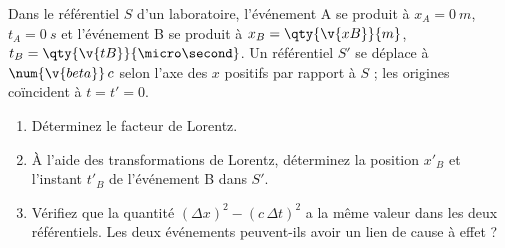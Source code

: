 Dans le référentiel $S$ d'un laboratoire, l'événement A se produit à $x_A = \qty{0}{m}$, $t_A = \qty{0}{s}$ et l'événement B se produit à $x_B = \qty{\v{xB}}{m}$, $t_B = \qty{\v{tB}}{\micro\second}$. Un référentiel $S'$ se déplace à $\num{\v{beta}}\,c$ selon l'axe des $x$ positifs par rapport à $S$ ; les origines coïncident à $t = t' = 0$.

\begin{enumerate}[label=\alph*)]
    \item Déterminez le facteur de Lorentz.
    \item À l'aide des transformations de Lorentz, déterminez la position $x'_B$ et l'instant $t'_B$ de l'événement B dans $S'$.
    \item Vérifiez que la quantité $(\Delta x)^2 - (c\,\Delta t)^2$ a la même valeur dans les deux référentiels. Les deux événements peuvent-ils avoir un lien de cause à effet ?
\end{enumerate}
